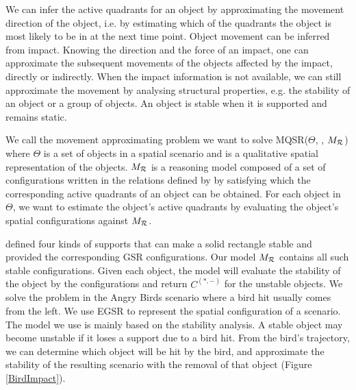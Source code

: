 \documentclass[letterpaper]{article}
\begin{document}
We can infer the active quadrants for an object by approximating the movement direction of the object, i.e. by estimating which of the quadrants the object is most likely to be in at the next time point. Object movement can be inferred from impact. Knowing the direction and the force of an impact, one can approximate the subsequent movements of the objects affected by the impact, directly or indirectly. When the impact information is not available, we can still approximate the movement by analysing structural properties, e.g. the stability of an object or a group of objects. An object is stable when it is supported and remains static. %

We call the movement approximating problem we want to solve MQSR($\Theta$, , $M_{\cal{R}}$) where $\Theta$ is a set of objects in a spatial scenario and  is a qualitative spatial representation of the objects. $M_{\cal{R}}$ is a reasoning model composed of a set of configurations written in the relations defined by  by satisfying which the corresponding active quadrants of an object can be obtained. For each object in $\Theta$, we want to estimate the object's active quadrants by evaluating the object's spatial configurations against $M_{\cal{R}}$.

\cite{Ge2013} defined four kinds of supports that can make a solid rectangle stable and provided the corresponding GSR configurations. Our model $M_{\cal R}$ contains all such stable configurations. Given each object, the model will evaluate the stability of the object by the configurations and return $C^{(*,-)}$ for the unstable objects. We solve the problem in the Angry Birds scenario where a bird hit usually comes from the left. We use EGSR to represent the spatial configuration of a scenario. The model we use is mainly based on the stability analysis. A stable object may become unstable if it loses a support due to a bird hit. From the bird's trajectory, we can determine which object will be hit by the bird, and approximate the stability of the resulting scenario with the removal of that object (Figure \ref{BirdImpact}). 
\end{document}
